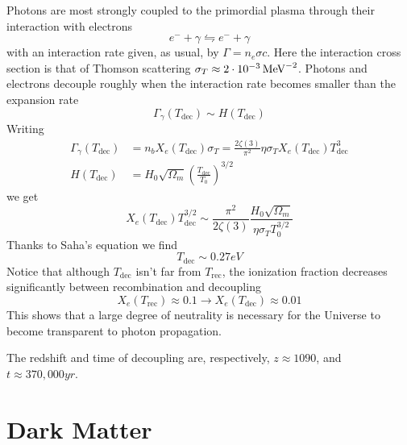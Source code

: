 Photons are most strongly coupled to the primordial plasma through their interaction with electrons
\begin{equation*}
    e^{-} + \gamma \leftrightharpoons e^{-} + \gamma
\end{equation*}
with an interaction rate given, as usual, by $\Gamma = n_{e}\sigma c$. Here the interaction cross section is that of Thomson scattering $\sigma_{T} \approx 2\cdot 10^{-3}\,\text{MeV}^{-2}$. Photons and electrons decouple roughly when the interaction rate becomes smaller than the expansion rate
\begin{equation}
    \Gamma_{\gamma}(T_{\text{dec}}) \sim H(T_{\text{dec}})
\end{equation}
Writing 
\begin{align*}
    \Gamma_{\gamma}(T_{\text{dec}}) &= n_{b}X_{e}(T_{\text{dec}})\sigma_{T} = \frac{2\zeta(3)}{\pi^{2}}\eta\sigma_{T}X_{e}(T_{\text{dec}})T_{\text{dec}}^{3}\\
    H(T_{\text{dec}}) &= H_{0}\sqrt{\Omega_{m}}\left(\frac{T_{\text{dec}}}{T_{0}}\right)^{3/2}
\end{align*}
we get
\begin{equation}
    X_{e}(T_{\text{dec}})T_{\text{dec}}^{3/2} \sim \frac{\pi^{2}}{2\zeta(3)}\frac{H_{0}\sqrt{\Omega_{m}}}{\eta\sigma_{T}T_{0}^{3/2}}
\end{equation}
Thanks to Saha's equation we find 
\begin{equation}
    T_{\text{dec}} \sim 0.27 \unit{eV}
\end{equation}
Notice that although $T_{\text{dec}}$ isn’t far from $T_{\text{rec}}$, the ionization fraction decreases significantly between recombination and decoupling $$X_{e}(T_{\text{rec}}) \approx 0.1 \to X_{e}(T_{\text{dec}}) \approx 0.01$$ This shows that a large degree of neutrality is necessary for the Universe to become transparent to photon propagation.
\par The redshift and time of decoupling are, respectively, $z \approx 1090$, and $t \approx 370,000\unit{yr}$.

\section{Dark Matter}


